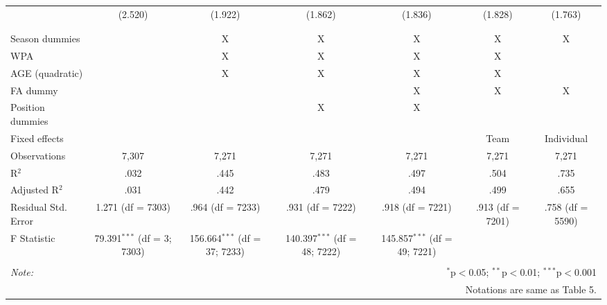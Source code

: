 \begin{table}[H]
\begin{tabular}{@{\extracolsep{5pt}}lcccccc}
  & (2.520) & (1.922) & (1.862) & (1.836) & (1.828) & (1.763) \\
  & & & & & & \\
\hline \\[-1.8ex]
Season dummies &  & X & X & X & X & X \\
WPA &  & X & X & X & X &  \\
AGE (quadratic) &  & X & X & X & X &  \\
FA dummy &  &  &  & X & X & X \\
Position dummies &  &  & X & X &  &  \\
Fixed effects &  &  &  &  & Team & Individual \\
Observations & 7,307 & 7,271 & 7,271 & 7,271 & 7,271 & 7,271 \\
R$^{2}$ & .032 & .445 & .483 & .497 & .504 & .735 \\
Adjusted R$^{2}$ & .031 & .442 & .479 & .494 & .499 & .655 \\
Residual Std. Error & 1.271 (df = 7303) & .964 (df = 7233) & .931 (df = 7222) & .918 (df = 7221) & .913 (df = 7201) & .758 (df = 5590) \\
F Statistic & 79.391$^{***}$ (df = 3; 7303) & 156.664$^{***}$ (df = 37; 7233) & 140.397$^{***}$ (df = 48; 7222) & 145.857$^{***}$ (df = 49; 7221) &  &  \\
\hline
\hline \\[-1.8ex]
\textit{Note:}  & \multicolumn{6}{r}{$^{*}$p$<$0.05; $^{**}$p$<$0.01; $^{***}$p$<$0.001} \\
& \multicolumn{6}{r}{Notations are same as Table 5.} \\
\end{tabular}
\end{table}
